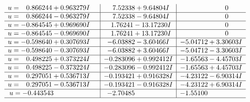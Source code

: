 \documentclass[1p]{elsarticle_modified}
\theoremstyle{definition}
\begin{document}
$$\begin{array}{c|c|c}
\begin{aligned}
u &= \phantom{-}0.866244 + 0.963279 I\end{aligned}
 & \phantom{-}7.52338 + 9.64804 I & \phantom{-0.000000 } 0 \\ \hline\begin{aligned}
u &= \phantom{-}0.866244 - 0.963279 I\end{aligned}
 & \phantom{-}7.52338 - 9.64804 I & \phantom{-0.000000 } 0 \\ \hline\begin{aligned}
u &= -0.864545 + 0.969690 I\end{aligned}
 & \phantom{-}1.76241 - 13.17230 I & \phantom{-0.000000 } 0 \\ \hline\begin{aligned}
u &= -0.864545 - 0.969690 I\end{aligned}
 & \phantom{-}1.76241 + 13.17230 I & \phantom{-0.000000 } 0 \\ \hline\begin{aligned}
u &= -0.598640 + 0.307693 I\end{aligned}
 & -6.03882 - 3.60466 I & -5.04712 + 3.30603 I \\ \hline\begin{aligned}
u &= -0.598640 - 0.307693 I\end{aligned}
 & -6.03882 + 3.60466 I & -5.04712 - 3.30603 I \\ \hline\begin{aligned}
u &= \phantom{-}0.498225 + 0.373224 I\end{aligned}
 & -0.283096 + 0.992412 I & -1.65563 - 4.45703 I \\ \hline\begin{aligned}
u &= \phantom{-}0.498225 - 0.373224 I\end{aligned}
 & -0.283096 - 0.992412 I & -1.65563 + 4.45703 I \\ \hline\begin{aligned}
u &= \phantom{-}0.297051 + 0.536713 I\end{aligned}
 & -0.193421 + 0.916328 I & -4.23122 - 6.90314 I \\ \hline\begin{aligned}
u &= \phantom{-}0.297051 - 0.536713 I\end{aligned}
 & -0.193421 - 0.916328 I & -4.23122 + 6.90314 I \\ \hline\begin{aligned}
u &= -0.443543\phantom{ +0.000000I}\end{aligned}
 & -2.70485\phantom{ +0.000000I} & -1.55100\phantom{ +0.000000I}\\
 \hline 
 \end{array}$$\newpage
\end{document}
